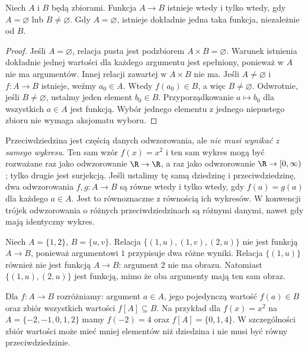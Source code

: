 \begin{twierdzenie}
\label{thm:function-existence-xliv}
Niech $A$ i $B$ będą zbiorami. Funkcja $A\to B$ istnieje wtedy
i tylko wtedy, gdy $A=\varnothing$ lub $B\ne\varnothing$.
Gdy $A=\varnothing$, istnieje dokładnie jedna taka funkcja, niezależnie
od $B$.
\end{twierdzenie}
\begin{proof}
Jeśli $A=\varnothing$, relacja pusta jest podzbiorem
$A\times B=\varnothing$. Warunek istnienia dokładnie jednej wartości
dla każdego argumentu jest spełniony, ponieważ w $A$ nie ma
argumentów. Innej relacji zawartej w $A\times B$ nie ma.
Jeśli $A\ne\varnothing$ i $f:A\to B$ istnieje, weźmy $a_0\in A$.
Wtedy $f(a_0)\in B$, a więc $B\ne\varnothing$.
Odwrotnie, jeśli $B\ne\varnothing$, ustalmy jeden element $b_0\in B$.
Przyporządkowanie $a\mapsto b_0$ dla wszystkich $a\in A$ jest funkcją.
Wybór jednego elementu z jednego niepustego zbioru nie wymaga aksjomatu
wyboru.
\end{proof}

\begin{uwaga}
Przeciwdziedzina jest częścią danych odwzorowania, ale \emph{nie musi
wynikać z samego wykresu}. Ten sam wzór $f(x)=x^2$ i ten sam wykres
mogą być rozważane raz jako odwzorowanie $\R\to\R$, a raz jako
odwzorowanie $\R\to[0,\infty)$; tylko drugie jest surjekcją.
Jeśli ustalimy tę samą dziedzinę i przeciwdziedzinę, dwa odwzorowania
$f,g:A\to B$ są równe wtedy i tylko wtedy, gdy $f(a)=g(a)$
dla każdego $a\in A$. Jest to równoznaczne z równością ich wykresów.
W konwencji trójek odwzorowania o różnych przeciwdziedzinach
są różnymi danymi, nawet gdy mają identyczny wykres.
\end{uwaga}
\begin{przyklad}
Niech $A=\{1,2\}$, $B=\{u,v\}$. Relacja $\{(1,u),(1,v),(2,u)\}$ nie jest funkcją $A\to B$, ponieważ argumentowi $1$ przypisuje dwa różne wyniki. Relacja $\{(1,u)\}$ również nie jest funkcją $A\to B$: argument $2$ nie ma obrazu. Natomiast $\{(1,u),(2,u)\}$ jest funkcją, mimo że oba argumenty mają ten sam obraz.
\end{przyklad}

\begin{uwaga}
Dla $f:A\to B$ rozróżniamy: argument $a\in A$,
jego pojedynczą wartość $f(a)\in B$ oraz zbiór wszystkich
wartości $f[A]\subseteq B$. Na przykład dla $f(x)=x^2$
na $A=\{-2,-1,0,1,2\}$ mamy $f(-2)=4$ oraz
$f[A]=\{0,1,4\}$. W szczególności zbiór wartości może mieć
mniej elementów niż dziedzina i nie musi być równy przeciwdziedzinie.
\end{uwaga}

